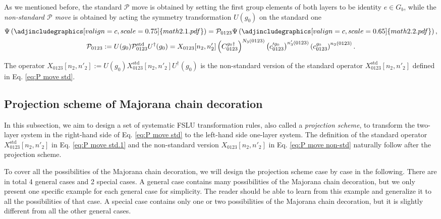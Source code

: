 \documentclass[%
 reprint,
 amsmath,amssymb,
 aps,
prb,
]{revtex4-2}
\begin{document}
\begin{widetext}
As we mentioned before, the standard $\mathcal P$ move is obtained by setting the first group elements of both layers to be identity $e \in G_b$, while the \textit{non-standard $\mathcal P$ move} is obtained by acting the symmetry transformation $U(g_0)$ on the standard one 
\begin{gather}
\Psi \left( \adjincludegraphics[valign=c,scale=0.75]{math2.1.pdf} \right) =\mathcal{P}_{0123} \Psi \left( \adjincludegraphics[valign=c,scale=0.65]{math2.2.pdf} \right) ,\\
\mathcal{P}_{0123} := U(g_0) \mathcal{P}_{0123}^{\mathrm{std}} U^{\dagger}(g_0) = X_{0123}[ n_{2} ,n'_{2}]\left( C_{0123}^{g_0\dagger }\right)^{N_{3}( 0123)}\left( c^{\prime g_0}_{0123}\right)^{n'_{3}( 0123)}\left( c_{0123}^{g_0}\right)^{n_{3}( 0123)} .\label{eq:P move non-std}
\end{gather}
\end{widetext}
The operator $X_{0123}[ n_{2} ,n'_{2}] := U(g_0) X_{0123}^{\mathrm{std}}[ n_{2} ,n'_{2}] U^{\dagger}(g_0)$ is the non-standard version of the standard operator $X_{0123}^{\mathrm{std}}[ n_{2} ,n'_{2}]$ defined in Eq. \eqref{eq:P move std}.


\subsection{Projection scheme of Majorana chain decoration}

In this subsection, we aim to design a set of systematic FSLU transformation rules, also called a \textit{projection scheme}, to transform the two-layer system in the right-hand side of Eq. \eqref{eq:P move std} to the left-hand side one-layer system.
The definition of the standard operator $X_{0123}^{\mathrm{std}}[ n_{2} ,n'_{2}]$ in Eq. \eqref{eq:P move std.1} and the non-standard version $X_{0123}[ n_{2} ,n'_{2}]$ in Eq. \eqref{eq:P move non-std} naturally follow after the projection scheme.

To cover all the possibilities of the Majorana chain decoration, we will design the projection scheme case by case in the following.
There are in total 4 general cases and 2 special cases.
A general case contains many possibilities of the Majorana chain decoration, but we only present one specific example for each general case for simplicity.
The reader should be able to learn from this example and generalize it to all the possibilities of that case.
A special case contains only one or two possibilities of the Majorana chain decoration, but it is slightly different from all the other general cases.
\end{document}

